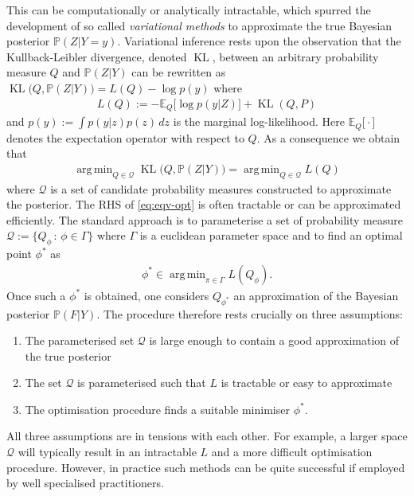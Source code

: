 \documentclass{article}
\newcommand{\bbP}{\mathbb{P}}
\newcommand{\bbE}{\mathbb{E}}
\newcommand{\calQ}{\mathcal{Q}}
\newcommand{\KL}{\operatorname{KL}}
\DeclareMathOperator*{\argmin}{arg\,min}
\numberwithin{equation}{section}
\begin{document}
This can be computationally or analytically intractable, which spurred the development of so called \textit{variational methods} to approximate the true Bayesian posterior $\bbP(Z|Y=y)$. Variational inference rests upon the observation that the Kullback-Leibler divergence, denoted $\KL$, between an arbitrary probability measure $Q$ and $\bbP(Z|Y)$ can be rewritten as $ \KL\big(Q , \bbP(Z|Y) \big) =  L(Q) - \log p(y)$ where
\begin{align}
   L(Q) := - \bbE_Q \big[ \log p(y|Z) \big] + \KL( Q, P)
\end{align}
 and $p(y):= \int p(y|z) p(z) \, dz $ is the marginal log-likelihood. Here $\bbE_Q \big[ \cdot \big] $ denotes the expectation operator with respect to $Q$. As a consequence we obtain that
 \begin{align}
     \argmin_{ Q \in \calQ } \KL\big( Q, \bbP(Z|Y) \big) =  \argmin_{ Q \in \calQ } L(Q) \label{eq:eqv-opt}
 \end{align}
where $\mathcal{Q}$ is a set of candidate probability measures constructed to approximate the posterior. The RHS of \eqref{eq:eqv-opt} is often tractable or can be approximated efficiently. The standard approach is to parameterise a set of probability measure $\calQ := \{ Q_\phi \, : \, \phi \in \Gamma \}$ where $\Gamma$ is a euclidean parameter space and to find an optimal point $\phi^*$ as
\begin{align}
    \phi^* \in \argmin_{\pi \in \Gamma} L(Q_\phi).
\end{align}
Once such a $\phi^*$ is obtained, one considers $Q_{\phi^*}$ an approximation of the Bayesian posterior $\bbP(F|Y)$. The procedure therefore rests crucially on three assumptions:
\begin{enumerate}
    \item The parameterised set $\calQ$ is large enough to contain a good approximation of the true posterior
    \item The set $\calQ$ is parameterised such that $L$ is tractable or easy to approximate
    \item The optimisation procedure finds a suitable minimiser $\phi^*$.
\end{enumerate}
All three assumptions are in tensions with each other. For example, a larger space $\calQ$ will typically result in an intractable $L$ and a more difficult optimisation procedure. However, in practice such methods can be quite successful if employed by well specialised practitioners.
\end{document}
